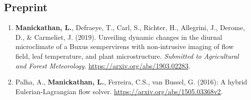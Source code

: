 \subsection*{Preprint}

\begin{enumerate}
	\item \textbf{Manickathan, L.}, Defraeye, T., Carl, S., Richter, H., Allegrini, J., Derome, D., \& Carmeliet, J. (2019). Unveiling dynamic changes in the diurnal microclimate of a Buxus sempervirens with non-intrusive imaging of flow field, leaf temperature, and plant microstructure. \textit{Submitted to Agricultural and Forest Meteorology}. \url{https://arxiv.org/abs/1903.02283}.
	
	\item Palha, A., \textbf{Manickathan, L.}, Ferreira, C.S., van Bussel, G. (2016): A hybrid Eulerian-Lagrangian flow solver. \url{https://arxiv.org/abs/1505.03368v2}.
\end{enumerate}

\vfill

